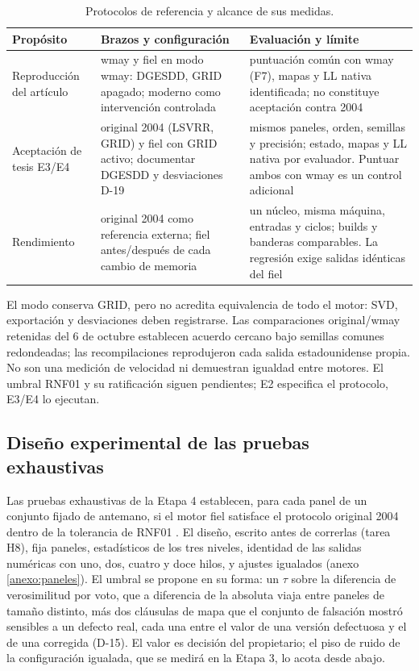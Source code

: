 \begin{table}[tbp]
\centering
\caption{Protocolos de referencia y alcance de sus medidas.}
\label{tab:protocolos}
\footnotesize
\begin{tabular}{L{2.4cm}L{4.8cm}L{5.2cm}}
\toprule
Propósito & Brazos y configuración & Evaluación y límite \\
\midrule
Reproducción del artículo & wmay y fiel en modo wmay: DGESDD, GRID apagado;
moderno como intervención controlada & puntuación común con wmay (F7), mapas y LL nativa
identificada; no constituye aceptación contra 2004 \\
\addlinespace
Aceptación de tesis E3/E4 & original 2004 (LSVRR, GRID) y fiel con GRID activo;
documentar DGESDD y desviaciones D-19 & mismos paneles, orden, semillas y precisión;
estado, mapas y LL nativa por evaluador. Puntuar ambos con wmay es un control adicional \\
\addlinespace
Rendimiento & original 2004 como referencia externa; fiel antes/después de cada
cambio de memoria & un núcleo, misma máquina, entradas y ciclos; builds y banderas
comparables. La regresión exige salidas idénticas del fiel \\
\bottomrule
\end{tabular}
\end{table}

El modo  conserva GRID, pero no acredita equivalencia de todo
el motor: SVD, exportación y desviaciones deben registrarse. Las comparaciones original/wmay
retenidas del 6 de octubre establecen acuerdo cercano bajo semillas comunes redondeadas;
las recompilaciones reprodujeron cada salida estadounidense propia. No son una medición de
velocidad ni demuestran igualdad entre motores. El umbral RNF01 y su ratificación siguen
pendientes; E2 especifica el protocolo, E3/E4 lo ejecutan.

\subsection{Diseño experimental de las pruebas exhaustivas}
\label{sec:experimental}

Las pruebas exhaustivas de la Etapa 4 establecen, para cada panel de un conjunto fijado de
antemano, si el motor fiel satisface el protocolo original 2004 dentro de la tolerancia de RNF01
\parencite[cap.~5, §2.2.1]{swebok2025}. El diseño, escrito antes de correrlas (tarea H8),
fija paneles, estadísticos de los tres niveles, identidad de las salidas numéricas con uno, dos, cuatro y
doce hilos, y ajustes igualados (anexo \ref{anexo:paneles}). El umbral se propone en su forma:
un $\tau$ sobre la diferencia de verosimilitud por voto, que a diferencia de la absoluta viaja
entre paneles de tamaño distinto, más dos cláusulas de mapa que el conjunto de falsación mostró
sensibles a un defecto real, cada una entre el valor de una versión defectuosa y el de una
corregida (D-15). El valor es decisión del propietario; el piso de ruido de la configuración
igualada, que se medirá en la Etapa 3, lo acota desde abajo.

